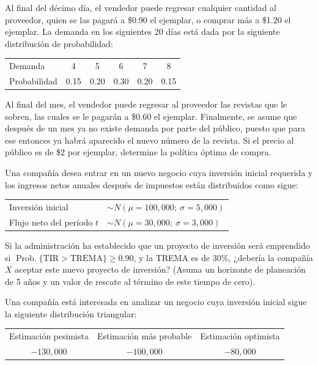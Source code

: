 \documentclass[11pt,letterpaper]{report}
\newcommand{\Prob}{\operatorname{Prob.}}
\begin{document}
\begin{description}[leftmargin=1.2cm,style=nextline]
Al final del décimo día, el vendedor puede regresar cualquier cantidad al
proveedor, quien se las pagará a \$0.90 el ejemplar, o comprar más a \$1.20 el
ejemplar. La demanda en los siguientes 20 días está dada por la siguiente
distribución de probabilidad:

\begin{center}
\begin{tabular}{lccccc}
Demanda & 4 & 5 & 6 & 7 & 8 \\
Probabilidad & 0.15 & 0.20 & 0.30 & 0.20 & 0.15 \\
\end{tabular}
\end{center}

Al final del mes, el vendedor puede regresar al proveedor las revistas que le
sobren, las cuales se le pagarán a \$0.60 el ejemplar. Finalmente, se asume
que después de un mes ya no existe demanda por parte del público, puesto que
para ese entonces ya habrá aparecido el nuevo número de la revista. Si el
precio al público es de \$2 por ejemplar, determine la política óptima de
compra.

\item[5.8.] Una compañía desea entrar en un nuevo negocio cuya inversión
inicial requerida y los ingresos netos anuales después de impuestos están
distribuidos como sigue:

\begin{center}
\begin{tabular}{ll}
Inversión inicial & $\sim N(\mu=100{,}000;\ \sigma=5{,}000)$ \\
Flujo neto del período $t$ & $\sim N(\mu=30{,}000;\ \sigma=3{,}000)$ \\
\end{tabular}
\end{center}

Si la administración ha establecido que un proyecto de inversión será
emprendido si $\Prob\{\text{TIR} > \text{TREMA}\} \ge 0.90$, y la TREMA es de
30\%, ¿debería la compañía $X$ aceptar este nuevo proyecto de inversión?
(Asuma un horizonte de planeación de 5 años y un valor de rescate al término
de este tiempo de cero).

\item[5.9.] Una compañía está interesada en analizar un negocio cuya
inversión inicial sigue la siguiente distribución triangular:

\begin{center}
\begin{tabular}{ccc}
Estimación pesimista & Estimación más probable & Estimación optimista \\
$-130{,}000$ & $-100{,}000$ & $-80{,}000$ \\
\end{tabular}
\end{center}


\end{description}
\end{document}
